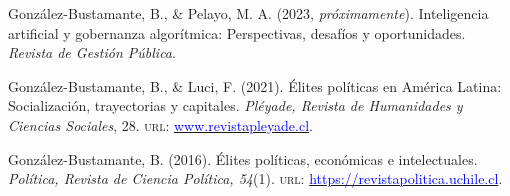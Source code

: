 





\begin{publications}

\begin{benumerate}{3}

\item{\small González-Bustamante, B., \& Pelayo, M. A. (2023, {\itshape próximamente}). Inteligencia artificial y gobernanza algorítmica: Perspectivas, desafíos y oportunidades. {\itshape Revista de Gestión Pública}.}\vspace{1mm}

\item{\small González-Bustamante, B., \& Luci, F. (2021). Élites políticas en América Latina: Socialización, trayectorias y capitales. {\itshape Pléyade, Revista de Humanidades y Ciencias Sociales}, 28. {\scshape url:} \href{http://www.revistapleyade.cl/index.php/OJS/issue/view/30}{\textcolor{blue}{www.revistapleyade.cl}}.}\vspace{1mm}

\item{\small González-Bustamante, B. (2016). Élites políticas, económicas e intelectuales. {\itshape Política, Revista de Ciencia Política, 54}(1). {\scshape url:} \href{https://revistapolitica.uchile.cl/index.php/RP/issue/view/4365}{\textcolor{blue}{https://revistapolitica.uchile.cl}}.}\vspace{1mm}

\end{benumerate}

\end{publications}

